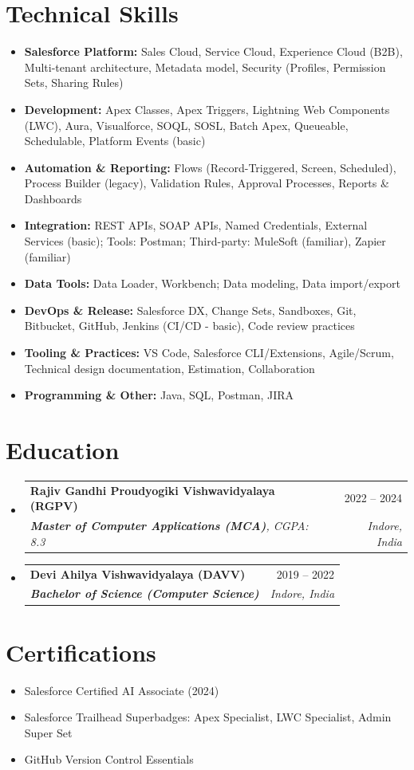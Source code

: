 \documentclass[letterpaper,10pt]{article}
\makeatletter
\newcommand{\resumeSubheading}[4]{
  \vspace{-3pt}\item
    \begin{tabular*}{1.0\textwidth}[t]{l@{\extracolsep{\fill}}r}
      \textbf{#1} & #2 \\
      \textit{#3} & \textit{#4} \\
    \end{tabular*}\vspace{-3pt}
}
\newcommand{\resumeSubHeadingListStart}{\begin{itemize}[leftmargin=0in,label={},topsep=0pt]}
\newcommand{\resumeSubHeadingListEnd}{\end{itemize}}
\makeatother
\begin{document}
\section{Technical Skills}
\begin{itemize}[leftmargin=0.15in,label={},topsep=0pt,noitemsep]
    \item \textbf{Salesforce Platform:} Sales Cloud, Service Cloud, Experience Cloud (B2B), Multi-tenant architecture, Metadata model, Security (Profiles, Permission Sets, Sharing Rules)
    \item \textbf{Development:} Apex Classes, Apex Triggers, Lightning Web Components (LWC), Aura, Visualforce, SOQL, SOSL, Batch Apex, Queueable, Schedulable, Platform Events (basic)
    \item \textbf{Automation \& Reporting:} Flows (Record-Triggered, Screen, Scheduled), Process Builder (legacy), Validation Rules, Approval Processes, Reports \& Dashboards
    \item \textbf{Integration:} REST APIs, SOAP APIs, Named Credentials, External Services (basic); Tools: Postman; Third-party: MuleSoft (familiar), Zapier (familiar)
    \item \textbf{Data Tools:} Data Loader, Workbench; Data modeling, Data import/export
    \item \textbf{DevOps \& Release:} Salesforce DX, Change Sets, Sandboxes, Git, Bitbucket, GitHub, Jenkins (CI/CD - basic), Code review practices
    \item \textbf{Tooling \& Practices:} VS Code, Salesforce CLI/Extensions, Agile/Scrum, Technical design documentation, Estimation, Collaboration
    \item \textbf{Programming \& Other:} Java, SQL, Postman, JIRA
\end{itemize}

\section{Education}
\resumeSubHeadingListStart
\resumeSubheading
{Rajiv Gandhi Proudyogiki Vishwavidyalaya (RGPV)}{2022 -- 2024}
{\textbf{Master of Computer Applications (MCA)}, CGPA: 8.3}{Indore, India}
\resumeSubheading
{Devi Ahilya Vishwavidyalaya (DAVV)}{2019 -- 2022}
{\textbf{Bachelor of Science (Computer Science)}}{Indore, India}
\resumeSubHeadingListEnd

\section{Certifications}
\begin{itemize}[leftmargin=0.15in,label={},topsep=0pt,noitemsep]
    \item Salesforce Certified AI Associate (2024)
    \item Salesforce Trailhead Superbadges: Apex Specialist, LWC Specialist, Admin Super Set
    \item GitHub Version Control Essentials
\end{itemize}
\end{document}
